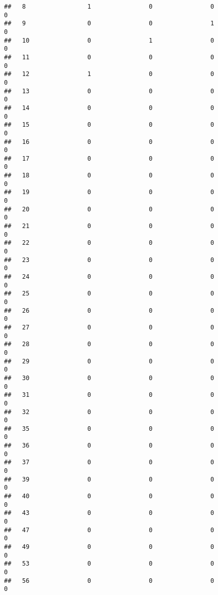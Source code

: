 \documentclass[]{article}
\begin{document}
\begin{verbatim}
##   8                 1                0                0                0
##   9                 0                0                1                0
##   10                0                1                0                0
##   11                0                0                0                0
##   12                1                0                0                0
##   13                0                0                0                0
##   14                0                0                0                0
##   15                0                0                0                0
##   16                0                0                0                0
##   17                0                0                0                0
##   18                0                0                0                0
##   19                0                0                0                0
##   20                0                0                0                0
##   21                0                0                0                0
##   22                0                0                0                0
##   23                0                0                0                0
##   24                0                0                0                0
##   25                0                0                0                0
##   26                0                0                0                0
##   27                0                0                0                0
##   28                0                0                0                0
##   29                0                0                0                0
##   30                0                0                0                0
##   31                0                0                0                0
##   32                0                0                0                0
##   35                0                0                0                0
##   36                0                0                0                0
##   37                0                0                0                0
##   39                0                0                0                0
##   40                0                0                0                0
##   43                0                0                0                0
##   47                0                0                0                0
##   49                0                0                0                0
##   53                0                0                0                0
##   56                0                0                0                0

\end{verbatim}
\end{document}
